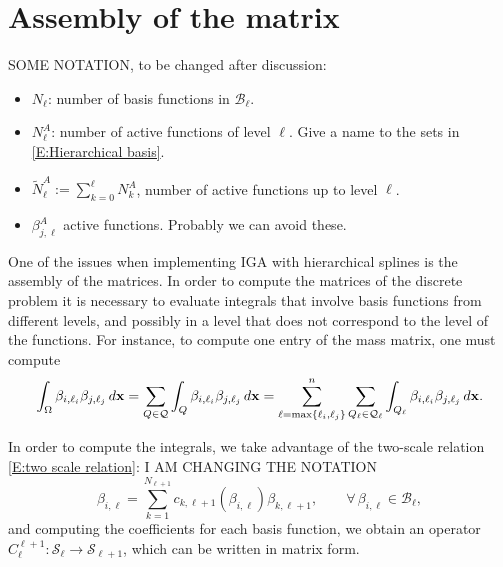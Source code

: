 \documentclass[12pt,a4paper,pdftex]{article}
\theoremstyle{plain}
\theoremstyle{definition}
\theoremstyle{remark}
\newcommand{\Rd}{\color{red}}
\newcommand{\note}[1]{{\noindent\centerline{\fbox{\parbox{.9\textwidth}{\textbf{
#1}}}}}}
\newcommand\BB{\mathcal B}
\newcommand\QQ{\mathcal Q}
\newcommand\VV{\mathcal S}
\newcommand{\bx}{{\bf x}}
\begin{document}

\section{Assembly of the matrix}
{\Rd SOME NOTATION, to be changed after discussion:
\begin{itemize}
\item $N_\ell$: number of basis functions in $\BB_\ell$.
\item $N^A_\ell$: number of active functions of level $\ell$. Give a name to the sets in \eqref{E:Hierarchical basis}.
\item $\tilde N^A_\ell := \sum_{k=0}^\ell N^A_k$, number of active functions up to level $\ell$.
\item $\beta^A_{j,\ell}$ active functions. Probably we can avoid these.
\end{itemize}
}

One of the issues when implementing IGA with hierarchical splines is the assembly of the matrices. In order to compute the matrices of the discrete problem it is necessary to evaluate integrals that involve basis functions from different levels, and possibly in a level that does not correspond to the level of the functions. For instance, to compute one entry of the mass matrix, one must compute
\begin{equation*}
\int_\Omega \beta_{i,\ell_i} \beta_{j,\ell_j} \, d\bx = \sum_{Q \in \QQ} \int_Q \beta_{i,\ell_i} \beta_{j,\ell_j} \, d\bx = \sum_{\ell = \max\{\ell_i, \ell_j\}}^n \sum_{Q_\ell \in \QQ_\ell} \int_{Q_\ell} \beta_{i,\ell_i} \beta_{j,\ell_j} \, d\bx.
\end{equation*}

In order to compute the integrals, we take advantage of the two-scale relation \eqref{E:two scale relation}: {\Rd I AM CHANGING THE NOTATION}
\begin{equation*}
 \beta_{i,\ell} = \sum_{k=1}^{N_{\ell+1}}
c_{k,\ell+1}(\beta_{i,\ell})\beta_{k,\ell+1}, 
\qquad \forall\,\beta_{i,\ell} \in\BB_\ell,
\end{equation*}
and computing the coefficients for each basis function, we obtain an operator $C_\ell^{\ell+1}: \VV_\ell \longrightarrow \VV_{\ell+1}$, which can be written in matrix form.
\end{document}
